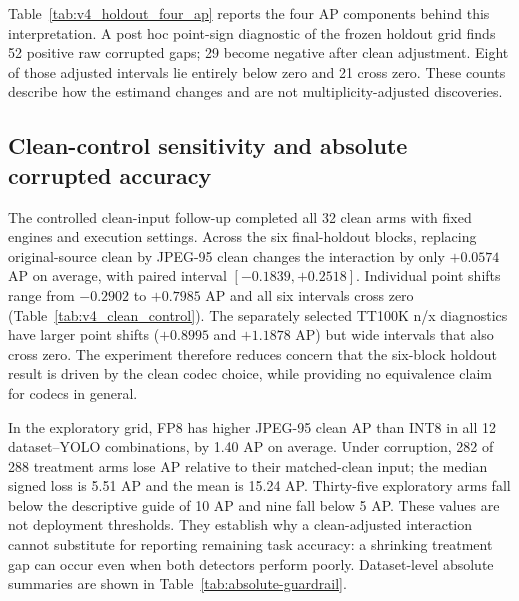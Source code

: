 \documentclass[a4paper,fleqn]{cas-dc}
\begin{document}
\begin{table}[t]
\centering
\caption{Dataset summaries from the final holdouts using original-source clean controls. Effects and intervals are AP points from common paired image samples.}
\label{tab:holdout}
\small
{}
\end{table}

Table~\ref{tab:v4_holdout_four_ap} reports the four AP components behind this interpretation. A post hoc point-sign diagnostic of the frozen holdout grid finds 52 positive raw corrupted gaps; 29 become negative after clean adjustment. Eight of those adjusted intervals lie entirely below zero and 21 cross zero. These counts describe how the estimand changes and are not multiplicity-adjusted discoveries.



\subsection{Clean-control sensitivity and absolute corrupted accuracy}
\label{sec:controlled-clean-results}
\label{sec:clean-results}
\label{sec:absolute-results}

The controlled clean-input follow-up completed all 32 clean arms with fixed engines and execution settings. Across the six final-holdout blocks, replacing original-source clean by JPEG-95 clean changes the interaction by only $+0.0574$ AP on average, with paired interval $[-0.1839,+0.2518]$. Individual point shifts range from $-0.2902$ to $+0.7985$ AP and all six intervals cross zero (Table~\ref{tab:v4_clean_control}). The separately selected TT100K n/x diagnostics have larger point shifts ($+0.8995$ and $+1.1878$ AP) but wide intervals that also cross zero. The experiment therefore reduces concern that the six-block holdout result is driven by the clean codec choice, while providing no equivalence claim for codecs in general.



In the exploratory grid, FP8 has higher JPEG-95 clean AP than INT8 in all 12 dataset--YOLO combinations, by 1.40 AP on average. Under corruption, 282 of 288 treatment arms lose AP relative to their matched-clean input; the median signed loss is 5.51 AP and the mean is 15.24 AP. Thirty-five exploratory arms fall below the descriptive guide of 10 AP and nine fall below 5 AP. These values are not deployment thresholds. They establish why a clean-adjusted interaction cannot substitute for reporting remaining task accuracy: a shrinking treatment gap can occur even when both detectors perform poorly. Dataset-level absolute summaries are shown in Table~\ref{tab:absolute-guardrail}.
\end{document}
